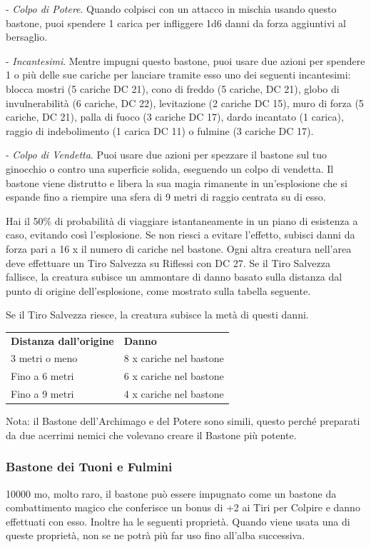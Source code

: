 \begin{multicols}{2}
- \textit{Colpo di Potere}. Quando colpisci con un attacco in mischia usando questo bastone, puoi spendere 1 carica per infliggere 1d6 danni da forza aggiuntivi al bersaglio.

- \textit{Incantesimi}. Mentre impugni questo bastone, puoi usare due azioni per spendere 1 o più delle sue cariche per lanciare tramite esso uno dei seguenti incantesimi: blocca mostri (5 cariche DC 21), cono di freddo (5 cariche, DC 21), globo di invulnerabilità (6 cariche, DC 22), levitazione (2 cariche DC 15), muro di forza (5 cariche, DC 21), palla di fuoco (3 cariche DC 17), dardo incantato (1 carica), raggio di indebolimento (1 carica DC 11) o fulmine (3 cariche DC 17).

- \textit{Colpo di Vendetta}. Puoi usare due azioni per spezzare il bastone sul tuo ginocchio o contro una superficie solida, eseguendo un colpo di vendetta. Il bastone viene distrutto e libera la sua magia rimanente in un'esplosione che si espande fino a riempire una sfera di 9 metri di raggio centrata su di esso.

Hai il 50\% di probabilità di viaggiare istantaneamente in un piano di esistenza a caso, evitando così l'esplosione. Se non riesci a evitare l'effetto, subisci danni da forza pari a 16 x il numero di cariche nel bastone. Ogni altra creatura nell'area deve effettuare un Tiro Salvezza su Riflessi con DC 27. Se il Tiro Salvezza fallisce, la creatura subisce un ammontare di danno basato sulla distanza dal punto di origine dell'esplosione, come mostrato sulla tabella seguente.

Se il Tiro Salvezza riesce, la creatura subisce la metà di questi danni.

\medskip

\begin{tabularx}{0.45\textwidth}{Xl}
\hline
\textbf{Distanza dall'origine} &\textbf{Danno}\\
3 metri o meno &8 x cariche nel bastone\\
Fino a 6 metri& 6 x cariche nel bastone\\
Fino a 9 metri& 4 x cariche nel bastone\\
\end{tabularx}

\medskip

Nota: il Bastone dell'Archimago e del Potere sono simili, questo perché preparati da due acerrimi nemici che volevano creare il Bastone più potente.

\subsubsection*{Bastone dei Tuoni e Fulmini}
10000 mo, molto raro, il bastone può essere impugnato come un bastone da combattimento magico che conferisce un bonus di +2 ai Tiri per Colpire e danno effettuati con esso. Inoltre ha le seguenti proprietà. Quando viene usata una di queste proprietà, non se ne potrà più far uso fino all'alba successiva.


\end{multicols}
